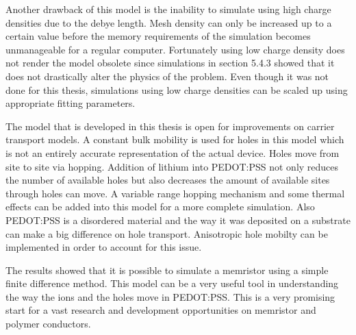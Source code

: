 \begin{doublespace}
Another drawback of this model is the inability to simulate using high charge densities due to the debye length. Mesh density can only be increased up to a certain value before the memory requirements of the simulation becomes unmanageable for a regular computer. Fortunately using low charge density does not render the model obsolete since simulations in section 5.4.3 showed that it does not drastically alter the physics of the problem. Even though it was not done for this thesis, simulations using low charge densities can be scaled up using appropriate fitting parameters.  
 
The model that is developed in this thesis is open for improvements on carrier transport models. A constant bulk mobility is used for holes in this model which is not an entirely accurate representation of the actual device. Holes move from site to site via hopping. Addition of lithium into PEDOT:PSS not only reduces the number of available holes but also decreases the amount of available sites through holes can move. A variable range hopping mechanism and some thermal effects can be added into this model for a more complete simulation. Also PEDOT:PSS is a disordered material and the way it was deposited on a substrate can make a big difference on hole transport. Anisotropic hole mobilty can be implemented in order to account for this issue.

The results showed that it is possible to simulate a memristor using a simple finite difference method. This model can be a very useful tool in understanding the way the ions and the holes move in PEDOT:PSS. This is a very promising start for a vast research and development opportunities on memristor and polymer conductors.

\end{doublespace}

